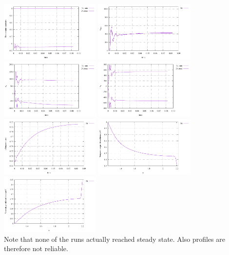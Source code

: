 \begin{center}
\includegraphics[width=5cm]{python_codes/fieldstone_106/results/exp2/stats_T.pdf}
\includegraphics[width=5cm]{python_codes/fieldstone_106/results/exp2/vrms.pdf}\\
\includegraphics[width=5cm]{python_codes/fieldstone_106/results/exp2/stats_vr.pdf}
\includegraphics[width=5cm]{python_codes/fieldstone_106/results/exp2/stats_vt.pdf}\\
\includegraphics[width=5cm]{python_codes/fieldstone_106/results/exp2/Tavrg.pdf}
\includegraphics[width=5cm]{python_codes/fieldstone_106/results/exp2/profile_T.pdf}\\
\includegraphics[width=5cm]{python_codes/fieldstone_106/results/exp2/profile_eta.pdf}\\
{\captionfont Note that none of the runs actually reached steady state. Also 
profiles are therefore not reliable.} 
\end{center}

